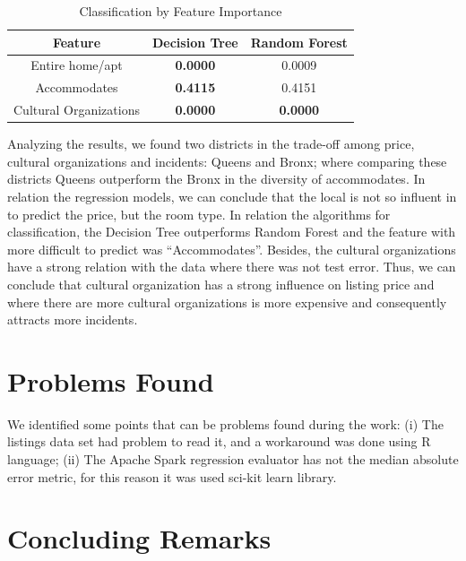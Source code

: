 \documentclass[sigconf]{acmart}
\begin{document}
\begin{table}[!htpb]
	\fontsize{7pt}{7pt}\selectfont
	\centering
	\caption{Classification by Feature Importance}
	\label{tab:classification}
	\begin{tabular}{ccc}
		\toprule
		   \textbf{Feature}    & \textbf{Decision Tree} & \textbf{Random Forest} \\ \midrule
		   Entire home/apt     &    \textbf{0.0000}     &         0.0009         \\ \midrule
		     Accommodates      &    \textbf{0.4115}     &         0.4151         \\ \midrule
		Cultural Organizations &    \textbf{0.0000}     &    \textbf{0.0000}     \\ \bottomrule
	\end{tabular}
\end{table}

Analyzing the results, we found two districts in the trade-off among price, cultural organizations and incidents: Queens and Bronx; where comparing these districts Queens outperform the Bronx in the diversity of accommodates. In relation the regression models, we can conclude that the local is not so influent in to predict the price, but the room type. In relation the algorithms for classification, the Decision Tree outperforms Random Forest and the feature with more difficult to predict was ``Accommodates''. Besides, the cultural organizations have a strong relation with the data where there was not test error. Thus, we can conclude that cultural organization has a strong influence on listing price and where there are more cultural organizations is more expensive and consequently attracts more incidents.

\section{Problems Found}
\label{sec:problemsfound}

We identified some points that can be problems found during the work: (i) The listings data set had problem to read it, and a workaround was done using R language; (ii) The Apache Spark regression evaluator has not the median absolute error metric, for this reason it was used sci-kit learn library.

\section{Concluding Remarks}
\label{sec:conclusion}
\end{document}
